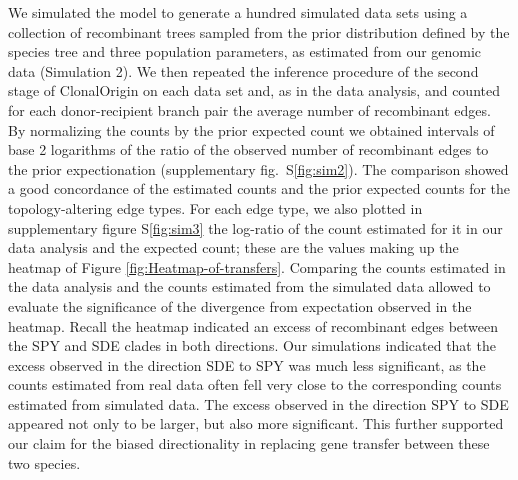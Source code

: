 \documentclass[12pt]{article}
\begin{document}
We simulated the model to generate a hundred simulated data sets using a
collection of recombinant trees sampled from the prior distribution defined by
the species tree and three population parameters, as estimated from our genomic
data (Simulation 2).  We then repeated the inference procedure of the second stage of
ClonalOrigin on each data set and, as in the data analysis, and counted
for each donor-recipient branch pair the average number of recombinant edges.
By normalizing the counts by the prior expected count we obtained intervals of
base 2 logarithms of the ratio of the observed number of recombinant edges to
the prior expectionation (supplementary fig.\ S\ref{fig:sim2}). 
The comparison showed a good
concordance of the estimated counts and the prior expected counts for 
the topology-altering edge types.
For each edge type, we also plotted in supplementary figure S\ref{fig:sim3} the
log-ratio of the count estimated for it in our data analysis and the expected
count; these are the values making up
the heatmap of Figure \ref{fig:Heatmap-of-transfers}. Comparing the counts
estimated in the data analysis and the counts estimated from the simulated data
allowed to evaluate the significance of the divergence from expectation observed
in the heatmap.  Recall the heatmap indicated an excess of recombinant edges
between the SPY and SDE clades in both directions. Our simulations indicated
that the excess observed in the direction SDE to SPY was much less significant,
as the counts estimated from real data often fell very close to the
corresponding counts estimated from simulated data. The excess observed in the
direction SPY to SDE appeared not only to be larger, but also more significant.
This further supported our claim for the biased directionality in replacing gene
transfer between these two species.
\end{document}

